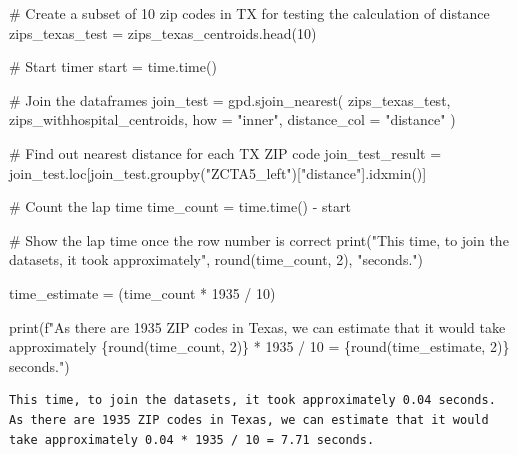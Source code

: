 \documentclass[
  letterpaper,
  DIV=11,
  numbers=noendperiod]{scrartcl}
\newenvironment{Shaded}{\begin{snugshade}}{\end{snugshade}}
\newcommand{\BuiltInTok}[1]{\textcolor[rgb]{0.00,0.23,0.31}{#1}}
\newcommand{\CommentTok}[1]{\textcolor[rgb]{0.37,0.37,0.37}{#1}}
\newcommand{\DecValTok}[1]{\textcolor[rgb]{0.68,0.00,0.00}{#1}}
\newcommand{\NormalTok}[1]{\textcolor[rgb]{0.00,0.23,0.31}{#1}}
\newcommand{\OperatorTok}[1]{\textcolor[rgb]{0.37,0.37,0.37}{#1}}
\newcommand{\SpecialCharTok}[1]{\textcolor[rgb]{0.37,0.37,0.37}{#1}}
\newcommand{\SpecialStringTok}[1]{\textcolor[rgb]{0.13,0.47,0.30}{#1}}
\newcommand{\StringTok}[1]{\textcolor[rgb]{0.13,0.47,0.30}{#1}}
\begin{document}
\begin{Shaded}
\begin{Highlighting}[]
\CommentTok{\# Create a subset of 10 zip codes in TX for testing the calculation of distance}
\NormalTok{zips\_texas\_test }\OperatorTok{=}\NormalTok{ zips\_texas\_centroids.head(}\DecValTok{10}\NormalTok{)}

\CommentTok{\# Start timer}
\NormalTok{start }\OperatorTok{=}\NormalTok{ time.time()}

\CommentTok{\# Join the dataframes}
\NormalTok{join\_test }\OperatorTok{=}\NormalTok{ gpd.sjoin\_nearest(}
\NormalTok{    zips\_texas\_test,}
\NormalTok{    zips\_withhospital\_centroids,}
\NormalTok{    how }\OperatorTok{=} \StringTok{"inner"}\NormalTok{,}
\NormalTok{    distance\_col }\OperatorTok{=} \StringTok{"distance"}
\NormalTok{)}

\CommentTok{\# Find out nearest distance for each TX ZIP code}
\NormalTok{join\_test\_result }\OperatorTok{=}\NormalTok{ join\_test.loc[join\_test.groupby(}\StringTok{"ZCTA5\_left"}\NormalTok{)[}\StringTok{"distance"}\NormalTok{].idxmin()]}

\CommentTok{\# Count the lap time}
\NormalTok{time\_count }\OperatorTok{=}\NormalTok{ time.time() }\OperatorTok{{-}}\NormalTok{ start}

\CommentTok{\# Show the lap time once the row number is correct}
\BuiltInTok{print}\NormalTok{(}\StringTok{"This time, to join the datasets, it took approximately"}\NormalTok{,}
 \BuiltInTok{round}\NormalTok{(time\_count, }\DecValTok{2}\NormalTok{), }\StringTok{"seconds."}\NormalTok{)}

\NormalTok{time\_estimate }\OperatorTok{=}\NormalTok{ (time\_count }\OperatorTok{*} \DecValTok{1935} \OperatorTok{/} \DecValTok{10}\NormalTok{)}

\BuiltInTok{print}\NormalTok{(}\SpecialStringTok{f"As there are 1935 ZIP codes in Texas, we can estimate that it would take approximately }\SpecialCharTok{\{}\BuiltInTok{round}\NormalTok{(time\_count, }\DecValTok{2}\NormalTok{)}\SpecialCharTok{\}}\SpecialStringTok{ * 1935 / 10 = }\SpecialCharTok{\{}\BuiltInTok{round}\NormalTok{(time\_estimate, }\DecValTok{2}\NormalTok{)}\SpecialCharTok{\}}\SpecialStringTok{ seconds."}\NormalTok{)}
\end{Highlighting}
\end{Shaded}

\begin{verbatim}
This time, to join the datasets, it took approximately 0.04 seconds.
As there are 1935 ZIP codes in Texas, we can estimate that it would take approximately 0.04 * 1935 / 10 = 7.71 seconds.
\end{verbatim}
\end{document}

